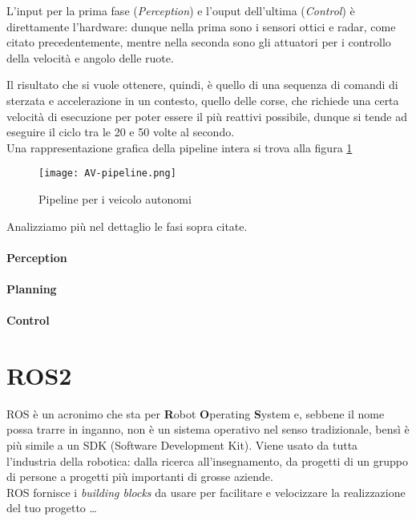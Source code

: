L'input per la prima fase (\textit{Perception}) e l'ouput dell'ultima (\textit{Control})
è direttamente l'hardware: dunque nella prima sono i sensori ottici e radar, come citato precedentemente,
mentre nella seconda sono gli attuatori per i controllo della velocità e angolo delle ruote.\par
Il risultato che si vuole ottenere, quindi, è quello di una sequenza di comandi di sterzata e accelerazione
in un contesto, quello delle corse, che richiede una certa velocità di esecuzione per poter essere
il più reattivi possibile, dunque si tende ad eseguire il ciclo tra le 20 e 50 volte al secondo.\\
Una rappresentazione grafica della pipeline intera si trova alla figura \ref{fig:av-pipeline}\\
\begin{figure}[t]
	\centering
	\texttt{[image: AV-pipeline.png]}
	\caption{Pipeline per i veicolo autonomi}
	\label{fig:av-pipeline}
\end{figure}

Analizziamo più nel dettaglio le fasi sopra citate. %
\paragraph{Perception}

\paragraph{Planning}

\paragraph{Control}

\section{ROS2}
\label{sec:ros}
ROS è un acronimo che sta per \textbf{R}obot \textbf{O}perating \textbf{S}ystem e,
sebbene il nome possa trarre in inganno, non è un sistema operativo nel senso tradizionale,
bensì è più simile a un SDK (Software Development Kit).
Viene usato da tutta l'industria della robotica: dalla ricerca all'insegnamento, da progetti
di un gruppo di persone a progetti più importanti di grosse aziende.\\
ROS fornisce i \textit{building blocks} da usare per facilitare e velocizzare la realizzazione
del tuo progetto \dots

